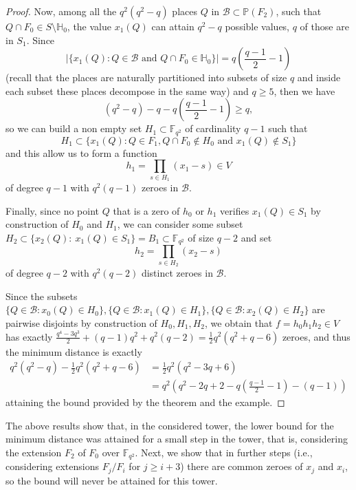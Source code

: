 \documentclass{amsart}
\newcommand{\m}{\mathcal}
\newcommand{\F}{\mathbb{F}}
\renewcommand{\P}{\mathbb{P}}
\theoremstyle{definition}
\begin{document}
\begin{proof}
	Now, among all the $q^2(q^2-q)$ places $Q$ in $\m{B} \subset \P(F_2)$, such that $Q\cap F_0 \in S\setminus \mathbb{H}_0 $, the value $x_1(Q)$ can attain $q^2-q$ possible values, $q$ of those are in $S_1$. Since $$|\{x_1(Q):Q\in \m{B} \text{ and }Q\cap F_0 \in \mathbb{H}_0 \}|=q \left(\frac{q-1}{2}-1\right)$$ (recall that the places are naturally partitioned into subsets of size $q$ and inside each subset these places decompose in the same way) and $q \geq 5$, then we have $$(q^2-q)-q - q\left(\frac{q-1}{2}-1\right) \geq q,$$ so we can build a non empty set $H_1\subset \F_{q^2}$ of cardinality $q-1$ such that $$ H_1\subset \{x_1(Q): Q\in F_1, Q\cap F_0 \not\in H_0 \text{ and } x_1(Q) \not\in S_1\}  %
	$$ 
	and  this allow us to form a function $$h_1 = \prod_{s \in H_1} (x_1 - s) \in V$$  of degree $q-1$ with $q^2(q-1)$ zeroes in $\m{B}$.
	
	Finally, since no point $Q$ that is a zero of $h_0$ or $h_1$ verifies $x_1(Q) \in S_1$ by construction of $H_0$ and $H_1$, we can consider some subset $H_2 \subset \{ x_2(Q): \: x_1(Q) \in S_1 \} = B_1 \subset \F_{q^2}$ of size $q-2$ and set $$h_2 = \prod_{s \in H_2} (x_2 - s)$$ of degree $q-2$ with $q^2(q-2)$ distinct zeroes in $\m{B}$.
	
	Since the subsets $\{Q \in \m{B}: x_0(Q) \in H_0 \}, \{Q \in \m{B}: x_1(Q) \in H_1 \}, \{Q \in \m{B}: x_2(Q) \in H_2 \}$ are pairwise disjoints by construction of $H_0,H_1,H_2$, we obtain that $f = h_0h_1h_2 \in V$ has exactly $\frac{q^4-3q^3}{2}+(q-1)q^2 +q^2(q-2) =  \frac{1}{2} q^2 \left( q^2 + q  -6 \right)$ zeroes, and thus the minimum distance is exactly \begin{align*} q^2(q^2-q) - \frac{1}{2} q^2 \left( q^2 + q  -6 \right) & = \frac{1}{2}q^2 (q^2-3q+6) \\ & = q^2 \left(q^2 -2q+2 -q  \left( \frac{q-1}{2} -1 \right) - (q-1) \right)\end{align*} 
	attaining the bound provided by the theorem and the example. 
	
\end{proof}




The above results show that, in the considered tower, the lower bound for the minimum distance was attained for a small step in the tower, that is, considering the extension $F_2$ of $F_0$ over $\F_{q^2}$. Next, we show that in further steps (i.e., considering extensions $F_j/F_i$ for $j \geq i+3$) there are common zeroes of $x_j$ and $x_i$, so the bound will never be attained for this tower. 
\end{document}
